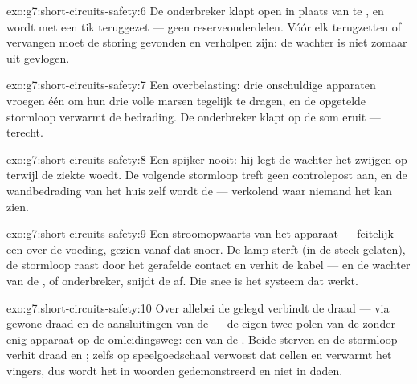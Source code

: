 \begin{solution}{exo:g7:short-circuits-safety:6}
De onderbreker klapt open in plaats van te , en wordt met een
tik teruggezet --- geen reserveonderdelen. Vóór elk terugzetten of
vervangen moet de storing gevonden en verholpen zijn: de wachter is
niet zomaar uit gevlogen.
\end{solution}

\begin{solution}{exo:g7:short-circuits-safety:7}
Een overbelasting: drie onschuldige apparaten vroegen één
 om hun drie volle marsen tegelijk te dragen, en de opgetelde
stormloop verwarmt de bedrading. De onderbreker klapt op de som eruit
--- terecht.
\end{solution}

\begin{solution}{exo:g7:short-circuits-safety:8}
Een spijker  nooit: hij legt de wachter het zwijgen op terwijl
de ziekte woedt. De volgende stormloop treft geen controlepost aan, en
de wandbedrading van het huis zelf wordt de  --- verkolend
waar niemand het kan zien.
\end{solution}

\begin{solution}{exo:g7:short-circuits-safety:9}
Een  stroomopwaarts van het apparaat --- feitelijk een
 over de voeding, gezien vanaf dat snoer. De lamp sterft
(in de steek gelaten), de stormloop raast door het gerafelde contact
en verhit de kabel --- en de wachter van de ,
 of onderbreker, snijdt de  af. Die snee is het
systeem dat werkt.
\end{solution}

\begin{solution}{exo:g7:short-circuits-safety:10}
Over allebei de  gelegd verbindt de draad --- via gewone draad
en de aansluitingen van de  --- de eigen twee
polen van de  zonder enig apparaat op de omleidingsweg:
een  van de . Beide  sterven en
de stormloop verhit draad en ; zelfs op speelgoedschaal
verwoest dat cellen en verwarmt het vingers, dus wordt het in woorden
gedemonstreerd en niet in daden.
\end{solution}


